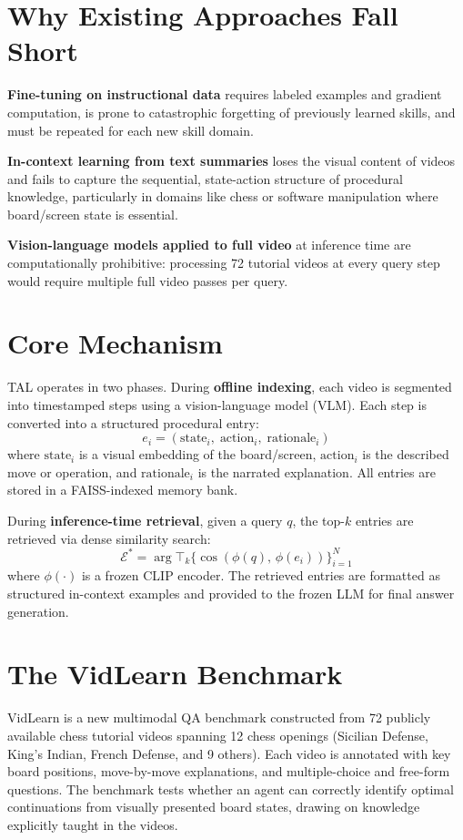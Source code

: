 \documentclass[10pt,twocolumn]{article}
\begin{document}
\section{Why Existing Approaches Fall Short}

\textbf{Fine-tuning on instructional data} requires labeled examples and
gradient computation, is prone to catastrophic forgetting of previously
learned skills, and must be repeated for each new skill domain.

\textbf{In-context learning from text summaries} loses the visual content
of videos and fails to capture the sequential, state-action structure of
procedural knowledge, particularly in domains like chess or software
manipulation where board/screen state is essential.

\textbf{Vision-language models applied to full video} at inference time
are computationally prohibitive: processing 72 tutorial videos at every
query step would require multiple full video passes per query.

\section{Core Mechanism}

TAL operates in two phases. During \textbf{offline indexing}, each video
is segmented into timestamped steps using a vision-language model (VLM).
Each step is converted into a structured procedural entry:
\[
  e_i = (\text{state}_i,\; \text{action}_i,\; \text{rationale}_i)
\]
where $\text{state}_i$ is a visual embedding of the board/screen,
$\text{action}_i$ is the described move or operation, and
$\text{rationale}_i$ is the narrated explanation. All entries are stored
in a FAISS-indexed memory bank.

During \textbf{inference-time retrieval}, given a query $q$, the top-$k$
entries are retrieved via dense similarity search:
\[
  \mathcal{E}^* = \arg\!\top_k \bigl\{\cos(\phi(q),\, \phi(e_i))\bigr\}_{i=1}^{N}
\]
where $\phi(\cdot)$ is a frozen CLIP encoder. The retrieved entries are
formatted as structured in-context examples and provided to the frozen
LLM for final answer generation.

\section{The VidLearn Benchmark}

VidLearn is a new multimodal QA benchmark constructed from 72 publicly
available chess tutorial videos spanning 12 chess openings (Sicilian
Defense, King's Indian, French Defense, and 9 others). Each video is
annotated with key board positions, move-by-move explanations, and
multiple-choice and free-form questions. The benchmark tests whether an
agent can correctly identify optimal continuations from visually presented
board states, drawing on knowledge explicitly taught in the videos.
\end{document}
